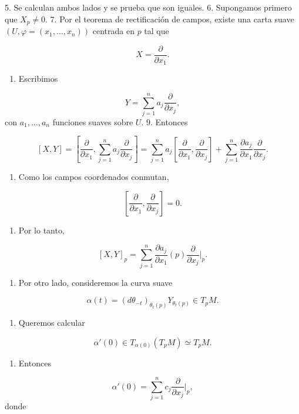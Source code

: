 \begin{bookproof}{}
5. Se calculan ambos lados y se prueba que son iguales. 6. Supongamos primero que $X_p\neq0$. 7. Por el teorema de rectificación de campos, existe una carta suave $(U,\varphi=(x_1,\ldots,x_n))$ centrada en $p$ tal que

\[
X=\frac{\partial}{\partial x_1}.
\]
\begin{enumerate}[start=8]
\item Escribimos
\end{enumerate}
\[
Y=\sum_{j=1}^n a_j\frac{\partial}{\partial x_j},
\]
con $a_1,\ldots,a_n$ funciones suaves sobre $U$. 9. Entonces

\[
[X,Y]=\left[\frac{\partial}{\partial x_1},\sum_{j=1}^n a_j\frac{\partial}{\partial x_j}\right]=\sum_{j=1}^n a_j\left[\frac{\partial}{\partial x_1},\frac{\partial}{\partial x_j}\right]+\sum_{j=1}^n \frac{\partial a_j}{\partial x_1}\frac{\partial}{\partial x_j}.
\]
\begin{enumerate}[start=10]
\item Como los campos coordenados conmutan,
\end{enumerate}
\[
\left[\frac{\partial}{\partial x_1},\frac{\partial}{\partial x_j}\right]=0.
\]
\begin{enumerate}[start=11]
\item Por lo tanto,
\end{enumerate}
\[
[X,Y]_p=\sum_{j=1}^n \frac{\partial a_j}{\partial x_1}(p)\frac{\partial}{\partial x_j}\bigg|_p.
\]
\begin{enumerate}[start=12]
\item Por otro lado, consideremos la curva suave
\end{enumerate}
\[
\alpha(t)=(d\theta_{-t})_{\theta_t(p)}Y_{\theta_t(p)}\in T_pM.
\]
\begin{enumerate}[start=13]
\item Queremos calcular
\end{enumerate}
\[
\alpha'(0)\in T_{\alpha(0)}(T_pM)\simeq T_pM.
\]
\begin{enumerate}[start=14]
\item Entonces
\end{enumerate}
\[
\alpha'(0)=\sum_{j=1}^n c_j\frac{\partial}{\partial x_j}\bigg|_p,
\]
donde


\end{bookproof}

